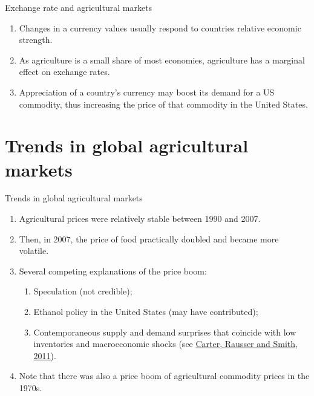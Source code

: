 \documentclass[table,xcolor=pdftex,dvipsnames]{beamer}\usepackage[]{graphicx}\usepackage[]{color}
\begin{document}

\begin{frame}{Exchange rate and agricultural markets}
\begin{enumerate}[label=\textbullet]
    \item Changes in a currency values usually respond to countries relative economic strength.
    \item As agriculture is a small share of most economies, agriculture has a marginal effect on exchange rates.
    \item Appreciation of a country's currency may boost its demand for a US commodity, thus increasing the price of that commodity in the United States.
\end{enumerate}
\end{frame}


\section{Trends in global agricultural markets}

\begin{frame}{Trends in global agricultural markets}
\begin{enumerate}[label=\textbullet]
    \item Agricultural prices were relatively stable between 1990 and 2007.
    \item Then, in 2007, the price of food practically doubled and became more volatile.
    \item Several competing explanations of the price boom:
      \begin{enumerate}[label=-]
        \item Speculation (not credible);
        \item Ethanol policy in the United States (may have contributed);
        \item Contemporaneous supply and demand surprises that coincide with low inventories and macroeconomic shocks (see \href{http://www.annualreviews.org/doi/abs/10.1146/annurev.resource.012809.104220?journalCode=resource}{Carter, Rausser and Smith, 2011}).
      \end{enumerate}
    \item Note that there was also a price boom of agricultural commodity prices in the 1970s.
\end{enumerate}
\end{frame}
\end{document}
